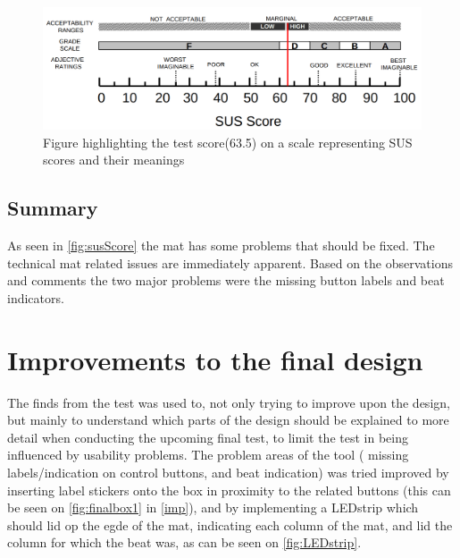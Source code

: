 \begin{figure}[H]
	\centering
	\includegraphics[width=1\linewidth]{figure/Design/susScore}
	\caption{Figure highlighting the test score(63.5) on a scale representing SUS scores and their meanings\cite{susScore}}
	\label{fig:susScore}
\end{figure}

\subsection{Summary}
As seen in \autoref{fig:susScore} the mat has some problems that should be fixed. The technical mat related issues are immediately apparent. Based on the observations and comments the two major problems were the missing button labels and beat indicators.

\section{Improvements to the final design}
The finds from the test was used to, not only trying to improve upon the design, but mainly to understand which parts of the design should be explained to more detail when conducting the upcoming final test, to limit the test in being influenced by usability problems. The problem areas of the tool ( missing labels/indication on control buttons, and beat indication) was tried improved by inserting label stickers onto the box in proximity to the related buttons (this can be seen on \autoref{fig:finalbox1} in \autoref{imp}), and by implementing a LEDstrip which should lid op the egde of the mat, indicating each column of the mat, and lid the column for which the beat was, as can be seen on \autoref{fig:LEDstrip}.  

